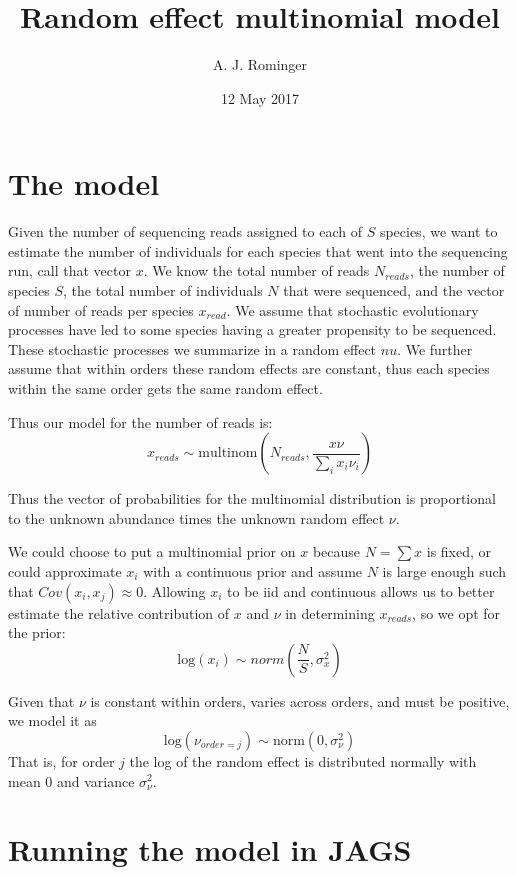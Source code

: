 \documentclass[]{article}
\title{Random effect multinomial model}
\author{A. J. Rominger}
\date{12 May 2017}
\begin{document}
\maketitle

\section{The model}\label{the-model}

Given the number of sequencing reads assigned to each of \(S\) species,
we want to estimate the number of individuals for each species that went
into the sequencing run, call that vector \(x\). We know the total
number of reads \(N_{reads}\), the number of species \(S\), the total
number of individuals \(N\) that were sequenced, and the vector of
number of reads per species \(x_{read}\). We assume that stochastic
evolutionary processes have led to some species having a greater
propensity to be sequenced. These stochastic processes we summarize in a
random effect \(nu\). We further assume that within orders these random
effects are constant, thus each species within the same order gets the
same random effect.

Thus our model for the number of reads is: \[
x_{reads} \sim \text{multinom}\left(N_{reads}, \frac{x\nu}{\sum_i x_i \nu_i}\right)
\]

Thus the vector of probabilities for the multinomial distribution is
proportional to the unknown abundance times the unknown random effect
\(\nu\).

We could choose to put a multinomial prior on \(x\) because
\(N = \sum x\) is fixed, or could approximate \(x_i\) with a continuous
prior and assume \(N\) is large enough such that
\(Cov(x_i, x_j) \approx 0\). Allowing \(x_i\) to be iid and continuous
allows us to better estimate the relative contribution of \(x\) and
\(\nu\) in determining \(x_{reads}\), so we opt for the prior: \[
\text{log}(x_i) \sim norm\left(\frac{N}{S}, \sigma^2_x\right)
\]

Given that \(\nu\) is constant within orders, varies across orders, and
must be positive, we model it as \[
\text{log}(\nu_{order=j}) \sim \text{norm}(0, \sigma^2_{\nu})
\] That is, for order \(j\) the log of the random effect is distributed
normally with mean 0 and variance \(\sigma^2_{\nu}\).

\section{Running the model in JAGS}\label{running-the-model-in-jags}
\end{document}
